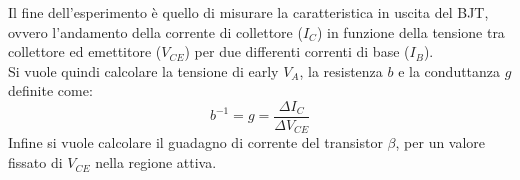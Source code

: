 \documentclass[../main.tex]{subfiles}
\begin{document}
    Il fine dell'esperimento è quello di misurare la caratteristica in uscita del BJT,
    ovvero l'andamento della corrente di collettore ($I_C$) in funzione della tensione
    tra collettore ed emettitore ($V_{CE}$) per due differenti correnti di base ($I_B$). \\
    Si vuole quindi calcolare la tensione di early $V_A$, la resistenza $b$ e la
    conduttanza $g$ definite come:
    \begin{equation}
        b^{-1} = g = \frac{\varDelta I_C}{\varDelta V_{CE}}
        \label{eq:g/b}
    \end{equation}
    Infine si vuole calcolare il guadagno di corrente del transistor
    $\beta$, per un valore fissato di $V_{CE}$ nella regione attiva.

\end{document}
